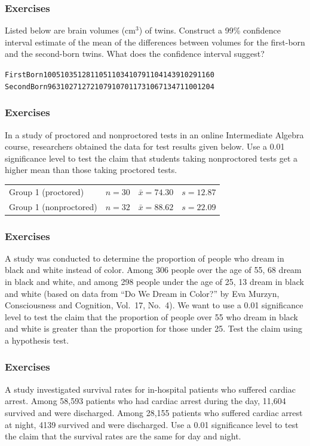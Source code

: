 \documentclass[xcolor=dvipsnames]{beamer}
\begin{document}
\begin{frame}
  \frametitle{Exercises}
 Listed below are brain volumes
(cm$^{3}$) of twins. Construct a 99\% confidence interval estimate of
the mean of the differences between volumes for the first-born and the
second-born twins. What does the confidence interval suggest?

\begin{alltt}
\small
First Born  1005  1035  1281  1051  1034  1079  1104  1439  1029  1160
Second Born  963  1027  1272  1079  1070  1173  1067  1347  1100  1204
\end{alltt}
\end{frame}

\begin{frame}
  \frametitle{Exercises}
 In a study of proctored
and nonproctored tests in an online Intermediate Algebra course,
researchers obtained the data for test results given below. Use a
0.01 significance level to test the claim that students taking
nonproctored tests get a higher mean than those taking proctored
tests. 

\bigskip

\begin{tabular}{llll}
  Group 1 (proctored) & $n=30$ & $\bar{x}=74.30$ & $s=12.87$ \\
  Group 1 (nonproctored) & $n=32$ & $\bar{x}=88.62$ & $s=22.09$
\end{tabular}

\end{frame}

\begin{frame}
  \frametitle{Exercises}
 A study was conducted to determine
the proportion of people who dream in black and white instead of
color. Among 306 people over the age of 55, 68 dream in black and
white, and among 298 people under the age of 25, 13 dream in black and
white (based on data from ``Do We Dream in Color?'' by Eva Murzyn,
Consciousness and Cognition, Vol.\ 17, No.\ 4). We want to use a 0.01
significance level to test the claim that the proportion of people
over 55 who dream in black and white is greater than the proportion
for those under 25. Test the claim using a hypothesis test.
\end{frame}

\begin{frame}
  \frametitle{Exercises}
 A study investigated
survival rates for in-hospital patients who suffered cardiac arrest.
Among 58,593 patients who had cardiac arrest during the day, 11,604
survived and were discharged. Among 28,155 patients who suffered
cardiac arrest at night, 4139 survived and were discharged. Use a 0.01
significance level to test the claim that the survival rates are the
same for day and night.
\end{frame}
\end{document}
